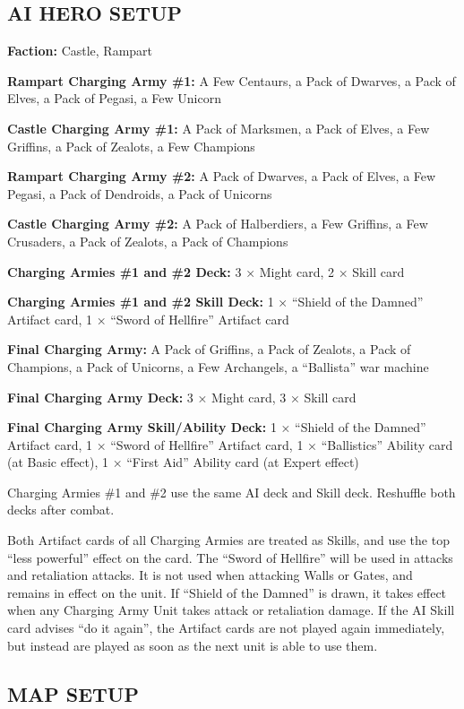 \begin{multicols*}{2}
\subsection*{\MakeUppercase{AI hero setup}}

\textbf{Faction:} Castle, Rampart

\textbf{Rampart Charging Army \#1:} A Few Centaurs, a Pack of Dwarves, a Pack of Elves, a Pack of Pegasi, a Few Unicorn

\textbf{Castle Charging Army \#1:} A Pack of Marksmen, a Pack of Elves, a Few Griffins, a Pack of Zealots, a Few Champions

\textbf{Rampart Charging Army \#2:} A Pack of Dwarves, a Pack of Elves, a Few Pegasi, a Pack of Dendroids, a Pack of Unicorns

\textbf{Castle Charging Army \#2:} A Pack of Halberdiers, a Few Griffins, a Few Crusaders, a Pack of Zealots, a Pack of Champions

\textbf{Charging Armies \#1 and \#2 Deck:} 3 × Might card, 2 × Skill card

\textbf{Charging Armies \#1 and \#2 Skill Deck:} 1 × ``Shield of the Damned'' Artifact card, 1 × ``Sword of Hellfire'' Artifact card

\textbf{Final Charging Army:} A Pack of Griffins, a Pack of Zealots, a Pack of Champions, a Pack of Unicorns, a Few Archangels, a ``Ballista'' war machine

\textbf{Final Charging Army Deck:} 3 × Might card, 3 × Skill card

\textbf{Final Charging Army Skill/Ability Deck:} 1 × ``Shield of the Damned'' Artifact card, 1 × ``Sword of Hellfire'' Artifact card,
  1 × ``Ballistics'' Ability card (at Basic effect), 1 × ``First Aid'' Ability card (at Expert effect)

Charging Armies \#1 and \#2 use the same AI deck and Skill deck. Reshuffle both decks after combat.

Both Artifact cards of all Charging Armies are treated as Skills, and use the top ``less powerful'' effect on the card.
The ``Sword of Hellfire'' will be used in attacks and retaliation attacks. It is not used when attacking Walls or Gates,
and remains in effect on the unit. If ``Shield of the Damned'' is drawn, it takes effect when
any Charging Army Unit takes attack or retaliation damage. If the AI Skill card advises ``do it again'', the Artifact
cards are not played again immediately, but instead are played as soon as the next unit is able to use them.

\subsection*{\MakeUppercase{Map setup}}


\end{multicols*}
